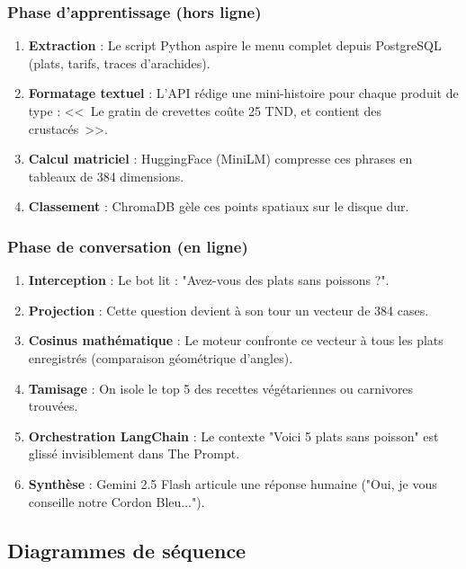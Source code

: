 \subsubsection{Phase d'apprentissage (hors ligne)}

\begin{enumerate}
    \item \textbf{Extraction} : Le script Python aspire le menu complet depuis PostgreSQL (plats, tarifs, traces d'arachides).
    \item \textbf{Formatage textuel} : L'API rédige une mini-histoire pour chaque produit de type : <<~Le gratin de crevettes coûte 25 TND, et contient des crustacés~>>.
    \item \textbf{Calcul matriciel} : HuggingFace (MiniLM) compresse ces phrases en tableaux de 384 dimensions.
    \item \textbf{Classement} : ChromaDB gèle ces points spatiaux sur le disque dur.
\end{enumerate}

\subsubsection{Phase de conversation (en ligne)}

\begin{enumerate}
    \item \textbf{Interception} : Le bot lit : "Avez-vous des plats sans poissons ?".
    \item \textbf{Projection} : Cette question devient à son tour un vecteur de 384 cases.
    \item \textbf{Cosinus mathématique} : Le moteur confronte ce vecteur à tous les plats enregistrés (comparaison géométrique d'angles).
    \item \textbf{Tamisage} : On isole le top 5 des recettes végétariennes ou carnivores trouvées.
    \item \textbf{Orchestration LangChain} : Le contexte "Voici 5 plats sans poisson" est glissé invisiblement dans The Prompt.
    \item \textbf{Synthèse} : Gemini 2.5 Flash articule une réponse humaine ("Oui, je vous conseille notre Cordon Bleu...").
\end{enumerate}

\subsection{Diagrammes de séquence}

